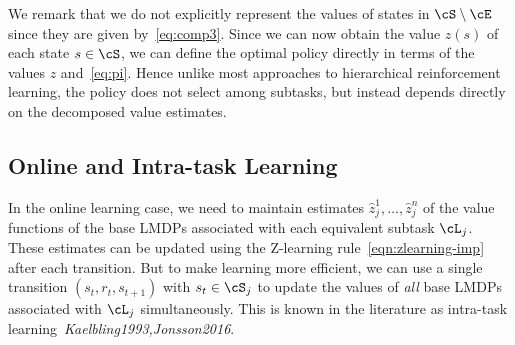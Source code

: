 We remark that we do not explicitly represent the values of states in $\cS\setminus\cE$ since they are given by~\eqref{eq:comp3}.
Since we can now obtain the value $z(s)$ of each state $s\in\cS$, we can define the optimal policy directly in terms of the values $z$ and~\eqref{eq:pi}. Hence unlike most approaches to hierarchical reinforcement learning, the policy does not select among subtasks, but instead depends directly on the decomposed value estimates.

\subsection{Online and Intra-task Learning}


In the online learning case, we need to maintain estimates $\hat{z}_j^1,\ldots,\hat{z}_j^n$ of the value functions of the base LMDPs associated with each equivalent subtask $\cL_j$.
These estimates can be updated using the Z-learning rule~\eqref{eqn:zlearning-imp} after each transition.
But to make learning more efficient, we can use a single transition $(s_t,r_t,s_{t+1})$ with $s_t\in\cS_j$ to update the values of {\em all} base LMDPs associated with $\cL_j$ simultaneously. This is known in the literature as intra-task learning~\textit{Kaelbling1993,Jonsson2016}.


